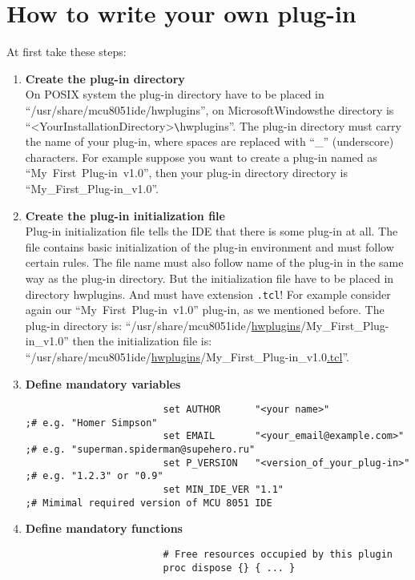 \documentclass[a4paper,twoside,12pt]{book}
\newcommand{\fileextension}[1]{\texttt{#1}}
\newcommand{\mysmallfont}{\fontsize{8pt}{10pt} \selectfont{}}
\begin{document}
	\section{How to write your own plug-in}
		At first take these steps:
		\begin{enumerate}
 			\item \textbf{Create the plug-in directory}\label{plug-in directory} \\
				On POSIX system the plug-in directory have to be placed in\\
				``/usr/share/mcu8051ide/hwplugins'', on Microsoft\textregistered Windows\textregistered the directory is ``<YourInstallationDirectory>\verb'\'hwplugins''. The plug-in directory must carry the name of your plug-in, where spaces are replaced with ``\_'' (underscore) characters. For example suppose you want to create a plug-in named as ``My~First~Plug-in~v1.0'', then your plug-in directory directory is ``My\_First\_Plug-in\_v1.0''.
			\item \textbf{Create the plug-in initialization file} \\
				Plug-in initialization file tells the IDE that there is some plug-in at all. The file contains basic initialization of the plug-in environment and must follow certain rules. The file name must also follow name of the plug-in in the same way as the plug-in directory. But the initialization file have to be placed in directory hwplugins. And must have extension \fileextension{.tcl}! For example consider again our ``My~First~Plug-in~v1.0'' plug-in, as we mentioned before. The plug-in directory is: ``/usr/share/mcu8051ide/\underline{hwplugins}/My\_First\_Plug-in\_v1.0'' then the initialization file is:\\
				``/usr/share/mcu8051ide/\underline{hwplugins}/My\_First\_Plug-in\_v1.0\underline{.tcl}''.
			\item \textbf{Define mandatory variables} \\
				{
					\mysmallfont{}
					\begin{verbatim}
						set AUTHOR      "<your name>"                ;# e.g. "Homer Simpson"
						set EMAIL       "<your_email@example.com>"   ;# e.g. "superman.spiderman@supehero.ru"
						set P_VERSION   "<version_of_your_plug-in>"  ;# e.g. "1.2.3" or "0.9"
						set MIN_IDE_VER "1.1"                        ;# Mimimal required version of MCU 8051 IDE
					\end{verbatim}
				}
			\item \textbf{Define mandatory functions} \\
				{
					\mysmallfont{}
					\begin{verbatim}
						# Free resources occupied by this plugin
						proc dispose {} { ... }


\end{verbatim}}
\end{enumerate}
\end{document}
